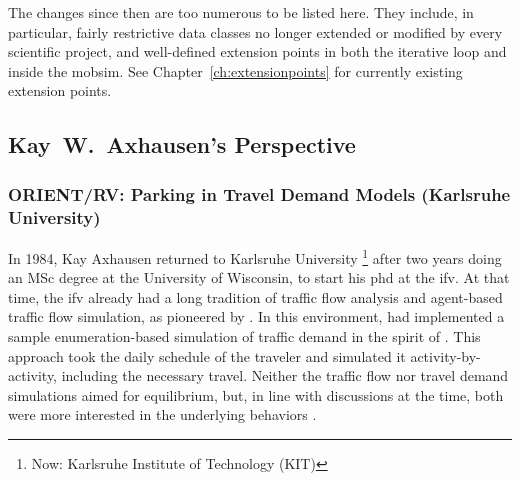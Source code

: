 The changes since then are too numerous to be listed here.  They include, in particular, fairly restrictive data classes no longer extended or modified by every scientific project, and well-defined extension points in both the iterative loop and inside the \gls{mobsim}.  See Chapter~\ref{ch:extensionpoints} for currently existing extension points.


\subsection{Kay~W.~Axhausen's Perspective}
\subsubsection{ORIENT/RV: Parking in Travel Demand Models (Karlsruhe University)}
In 1984, Kay Axhausen returned to Karlsruhe University%
\footnote{
Now: Karlsruhe Institute of Technology (KIT)
}
after two years doing an MSc degree at the University of Wisconsin, to start his \acrshort{phd} at the \gls{ifv}. At that time, the \gls{ifv} already had a long tradition of traffic flow analysis \citep[][]{Leutzbach1972Buch} and agent-based traffic flow simulation, as pioneered by \citet[][]{Wiedemann_PhDThesis_1974} \citep[see also][]{LeutzbachWiedemann_TEC_1986}. In this environment, \citet[][]{Sparmann_TechRep_1980} had implemented a sample enumeration-based simulation of traffic demand in the spirit of \citet[][]{PoeckZumkeller_PTRC_1978}. This approach took the daily schedule of the traveler and simulated it activity-by-activity, including the necessary travel. Neither the traffic flow nor travel demand simulations aimed for equilibrium, but, in line with discussions at the time, both were more interested in the underlying behaviors \citep[e.g.,][]{JonesEtAl_1983}.

